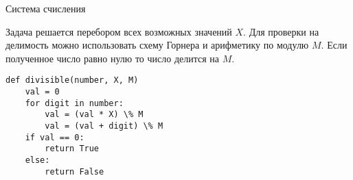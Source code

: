 \begin{tutorial}{Система счисления}

Задача решается перебором всех возможных значений $X$. Для проверки на делимость можно использовать схему Горнера и арифметику по модулю $M$. Если полученное число равно нулю то число делится на $M$.

\begin{verbatim}
def divisible(number, X, M)
    val = 0
    for digit in number:
        val = (val * X) \% M
        val = (val + digit) \% M
    if val == 0:
        return True
    else:
        return False
\end{verbatim}

\end{tutorial}
